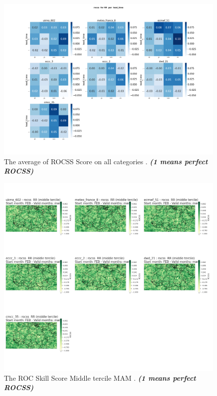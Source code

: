 \begin{figure}[H]
    \centering
    \includegraphics[scale=0.25]{plots/prob/rocss/rocss_RR_lead_time.png}
    \caption{The average of  ROCSS Score on all categories    . \textbf{\textit{(1 means perfect ROCSS)}}}
\end{figure}



\begin{figure}[H]
    \centering
    \includegraphics[scale=0.3]{plots/prob/rocss/rocss_mam_RR_middle.png}
    \caption{The ROC Skill Score Middle tercile MAM . \textbf{\textit{(1 means perfect ROCSS)}}}
\end{figure}

